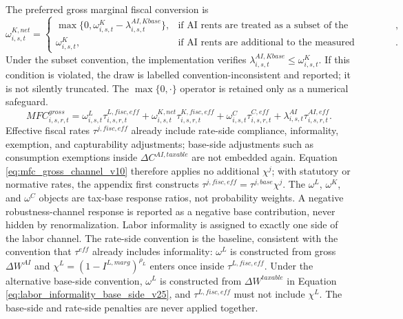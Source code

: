 \documentclass[11pt,a4paper]{article}
\begin{document}
The preferred gross marginal fiscal conversion is
\begin{equation}\label{eq:omega_k_net_v16}
    \omega^{K,net}_{i,s,t}=\begin{cases}
    \max\{0,\omega^K_{i,s,t}-\lambda^{AI,Kbase}_{i,s,t}\}, & \text{if AI rents are treated as a subset of the capital/profit base},\\
    \omega^K_{i,s,t}, & \text{if AI rents are additional to the measured capital/profit base}.
    \end{cases}
\end{equation}
Under the subset convention, the implementation verifies $\lambda^{AI,Kbase}_{i,s,t}\leq\omega^K_{i,s,t}$. If this condition is violated, the draw is labelled convention-inconsistent and reported; it is not silently truncated. The $\max\{0,\cdot\}$ operator is retained only as a numerical safeguard.
\begin{equation}\label{eq:mfc_gross_channel_v10}
    MFC^{gross}_{i,s,r,t}
    =
    \omega^L_{i,s,t}\tau^{L,fisc,eff}_{i,s,r,t}
    +\omega^{K,net}_{i,s,t}\tau^{K,fisc,eff}_{i,s,r,t}
    +\omega^C_{i,s,t}\tau^{C,eff}_{i,s,r,t}
    +\lambda^{AI}_{i,s,t}\tau^{AI,eff}_{i,s,r,t}.
\end{equation}
Effective fiscal rates $\tau^{j,fisc,eff}$ already include rate-side compliance, informality, exemption, and capturability adjustments; base-side adjustments such as consumption exemptions inside $\Delta C^{AI,taxable}$ are not embedded again. Equation \eqref{eq:mfc_gross_channel_v10} therefore applies no additional $\chi^j$; with statutory or normative rates, the appendix first constructs $\tau^{j,fisc,eff}=\tau^{j,base}\chi^j$. The $\omega^L$, $\omega^K$, and $\omega^C$ objects are tax-base response ratios, not probability weights. A negative robustness-channel response is reported as a negative base contribution, never hidden by renormalization.
Labor informality is assigned to exactly one side of the labor channel. The rate-side convention is the baseline, consistent with the convention that $\tau^{eff}$ already includes informality: $\omega^L$ is constructed from gross $\Delta W^{AI}$ and $\chi^L=(1-I^{L,marg})^{\rho_L}$ enters once inside $\tau^{L,fisc,eff}$. Under the alternative base-side convention, $\omega^L$ is constructed from $\Delta W^{taxable}$ in Equation \eqref{eq:labor_informality_base_side_v25}, and $\tau^{L,fisc,eff}$ must not include $\chi^L$. The base-side and rate-side penalties are never applied together.
\end{document}
